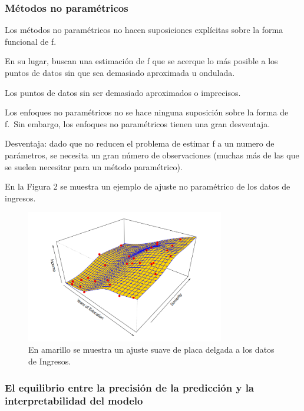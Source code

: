 \documentclass[
  letterpaper,
  DIV=11,
  numbers=noendperiod]{scrartcl}
\begin{document}
\hypertarget{muxe9todos-no-paramuxe9tricos}{%
\subsubsection{\texorpdfstring{\textbf{Métodos no
paramétricos}}{Métodos no paramétricos}}\label{muxe9todos-no-paramuxe9tricos}}

Los métodos no paramétricos no hacen suposiciones explícitas sobre la
forma funcional de f.

En su lugar, buscan una estimación de f que se acerque lo más posible a
los puntos de datos sin que sea demasiado aproximada u ondulada.

Los puntos de datos sin ser demasiado aproximados o imprecisos.

Los enfoques no paramétricos no se hace ninguna suposición sobre la
forma de f.~Sin embargo, los enfoques no paramétricos tienen una gran
desventaja.

Desventaja: dado que no reducen el problema de estimar f a un numero de
parámetros, se necesita un gran número de observaciones (muchas más de
las que se suelen necesitar para un método paramétrico).

En la Figura 2 se muestra un ejemplo de ajuste no paramétrico de los
datos de ingresos.

\begin{figure}

{\centering \includegraphics[width=3.40625in,height=\textheight]{images/figura2.png}

}

\caption{En amarillo se muestra un ajuste suave de placa delgada a los
datos de Ingresos.}

\end{figure}

\hypertarget{el-equilibrio-entre-la-precisiuxf3n-de-la-predicciuxf3n-y-la-interpretabilidad-del-modelo}{%
\subsubsection{\texorpdfstring{\textbf{El equilibrio entre la precisión
de la predicción y la interpretabilidad del
modelo}}{El equilibrio entre la precisión de la predicción y la interpretabilidad del modelo}}\label{el-equilibrio-entre-la-precisiuxf3n-de-la-predicciuxf3n-y-la-interpretabilidad-del-modelo}}
\end{document}
